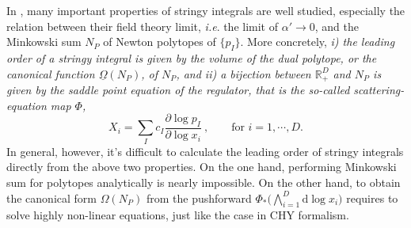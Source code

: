 \documentclass[12pt]{article}
\theoremstyle{definition}
\theoremstyle{plain}
\newcommand{\dif}{\mathrm{d}} %
\begin{document}


In \cite{Arkani-Hamed:2019mrd}, many important properties of stringy integrals are well studied, especially the relation between their field theory limit, {\it{i.e}}. the limit of $\alpha'\to 0$, and the Minkowski sum $N_{P}$ of Newton polytopes of $\{p_I\}$.
More concretely, {\it{ i) the leading order of a stringy integral is given by the volume of the dual polytope, or the canonical function $\underline{\Omega}(N_{P})$, of $N_{P}$, and ii) a bijection between $\mathbb{R}_{+}^{D}$ and $N_{P}$ is given by the saddle point equation of the regulator, that is the so-called scattering-equation map $\Phi$,}}
\begin{equation} \label{SEmap}
	X_{i}= \sum_{I}c_{I}\frac{\partial \log p_{I}}{\partial \log x_{i}}\:, \qquad  \text{for }i=1,\cdots,D.
\end{equation}	
In general, however, it's difficult to calculate the leading order of stringy integrals directly from the above two properties.
On the one hand, performing Minkowski sum for polytopes analytically is nearly impossible. On the other hand, to obtain the canonical form $\Omega(N_{P})$ from the pushforward $\Phi_{\ast}\bigl(\bigwedge_{i=1}^{D} \dif \log x_{i}\bigr)$ requires to solve highly non-linear equations, just like the case in CHY formalism.
\end{document}
